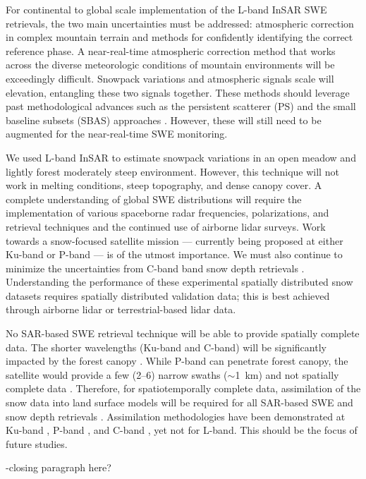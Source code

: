 For continental to global scale implementation of the L-band InSAR SWE retrievals, the two main uncertainties must be addressed: atmospheric correction in complex mountain terrain and methods for confidently identifying the correct reference phase. A near-real-time atmospheric correction method that works across the diverse meteorologic conditions of mountain environments will be exceedingly difficult. Snowpack variations and atmospheric signals scale will elevation, entangling these two signals together. These methods should leverage past methodological advances such as the persistent scatterer (PS) \citep{ferrettiPermanentScatterersSAR2001} and the small baseline subsets (SBAS) approaches \citep{berardinoNewAlgorithmSurface2002a,yunjunSmallBaselineInSAR2019a}. However, these will still need to be augmented for the near-real-time SWE monitoring.

We used L-band InSAR to estimate snowpack variations in an open meadow and lightly forest moderately steep environment. However, this technique will not work in melting conditions, steep topography, and dense canopy cover. A complete understanding of global SWE distributions will require the implementation of various spaceborne radar frequencies, polarizations, and retrieval techniques and the continued use of airborne lidar surveys. Work towards a snow-focused satellite mission --- currently being proposed at either Ku-band \citep{tsangReviewArticleGlobal2022, garnaudQuantifyingSnowMass2019} or P-band \citep{shahRemoteSensingSnow2017} --- is of the utmost importance. We must also continue to minimize the uncertainties from C-band band snow depth retrievals \citep{lievensSnowDepthVariability2019,lievensSentinel1SnowDepth2022}. Understanding the performance of these experimental spatially distributed snow datasets requires spatially distributed validation data; this is best achieved through airborne lidar \citep{painterAirborneSnowObservatory2016} or terrestrial-based lidar data.

No SAR-based SWE retrieval technique will be able to provide spatially complete data. The shorter wavelengths (Ku-band and C-band) will be significantly impacted by the forest canopy \citep{rottColdRegionsHydrology2010}. While P-band can penetrate forest canopy, the satellite would provide a few (2--6) narrow swaths ($\sim$1~km) and not spatially complete data \citep{yuehSatelliteSyntheticAperture2021}. Therefore, for spatiotemporally complete data, assimilation of the snow data into land surface models will be required for all SAR-based SWE and snow depth retrievals \citep{girottoDataAssimilationImproves2020}. Assimilation methodologies have been demonstrated at Ku-band \citep{wrzesienDevelopmentNatureRun2022, choEvaluatingUtilityActive2022}, P-band \citep{maEstimatingSpatiotemporallyContinuous2023}, and C-band \citep{girottoIdentifyingSnowfallElevation2023, brangersSentinel1SnowDepth2023}, yet not for L-band. This should be the focus of future studies.

-closing paragraph here?



